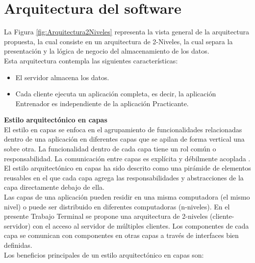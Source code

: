 \chapter{Arquitectura del software}
La Figura \ref{fig:Arquitectura2Niveles}  representa la vista general de la arquitectura propuesta, la cual consiste en un arquitectura de 2-Niveles, la cual separa la presentación y la lógica de negocio del almacenamiento de los datos.\\

Esta arquitectura contempla las siguientes características:
\begin{itemize}
	\item El servidor almacena los datos.
	\item Cada cliente ejecuta un aplicación completa, es decir, la aplicación Entrenador es independiente de la aplicación Practicante.
\end{itemize}

\textbf{{\large{Estilo arquitectónico en capas}}}\\

El estilo en capas se enfoca en el agrupamiento de funcionalidades relacionadas dentro de una aplicación en diferentes capas que se apilan de forma vertical una sobre otra. La funcionalidad dentro de cada capa tiene un rol común o responsabilidad. La comunicación entre capas es explícita y débilmente acoplada \cite{MArchitecture}.\\

El estilo arquitectónico en capas ha sido descrito como una pirámide de elementos reusables en el que cada capa agrega las responsabilidades y abstracciones de la capa directamente debajo de ella.\\

Las capas de una aplicación pueden residir en una misma computadora (el mismo nivel) o puede ser distribuido en diferentes computadoras (n-niveles). En el presente Trabajo Terminal se propone una arquitectura de 2-niveles (cliente-servidor) con el acceso al servidor de múltiples clientes. Los componentes de cada capa se comunican con componentes en otras capas a través de interfaces bien definidas.\\

Los beneficios principales de un estilo arquitectónico en capas son:\\

